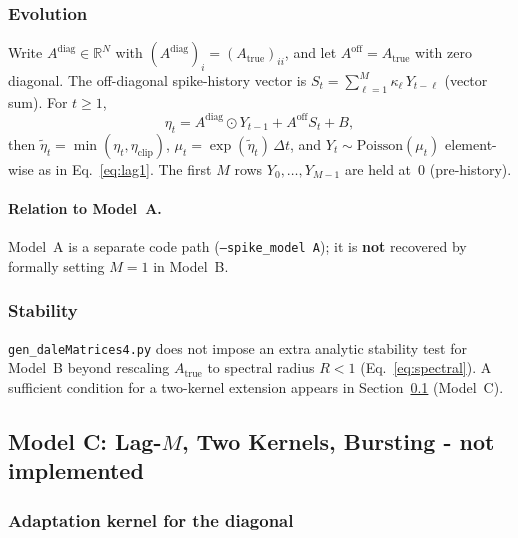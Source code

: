 \documentclass[11pt]{article}
\begin{document}
\subsubsection{Evolution}

Write $A^{\mathrm{diag}}\in\mathbb{R}^N$ with
$(A^{\mathrm{diag}})_i=(A_{\text{true}})_{ii}$, and let
$A^{\mathrm{off}}=A_{\text{true}}$ with zero diagonal.
The off-diagonal spike-history vector is
$S_t=\sum_{\ell=1}^{M}\kappa_\ell\,Y_{t-\ell}$ (vector sum).
For $t\ge 1$,
\begin{equation}
  \eta_t
  = A^{\mathrm{diag}}\odot Y_{t-1} + A^{\mathrm{off}} S_t + B,
  \label{eq:modelB_drive}
\end{equation}
then $\tilde\eta_t=\min(\eta_t,\eta_{\mathrm{clip}})$,
$\mu_t=\exp(\tilde\eta_t)\,\Delta t$, and
$Y_t\sim\mathrm{Poisson}(\mu_t)$ element-wise as in
Eq.~\eqref{eq:lag1}.
The first $M$ rows $Y_0,\dots,Y_{M-1}$ are held at~$0$ (pre-history).

\paragraph{Relation to Model~A.}
Model~A is a separate code path (\texttt{--spike\_model A}); it is
\textbf{not} recovered by formally setting $M=1$ in Model~B.

\subsubsection{Stability}

\texttt{gen\_daleMatrices4.py} does not impose an extra analytic
stability test for Model~B beyond rescaling $A_{\text{true}}$ to
spectral radius $R<1$ (Eq.~\ref{eq:spectral}).  A sufficient
condition for a two-kernel extension appears in
Section~\ref{sec:lagM_two} (Model~C).


\subsection{Model C: Lag-$M$, Two Kernels, Bursting - not implemented}
\label{sec:lagM_two}

\subsubsection{Adaptation kernel for the diagonal}
\end{document}
